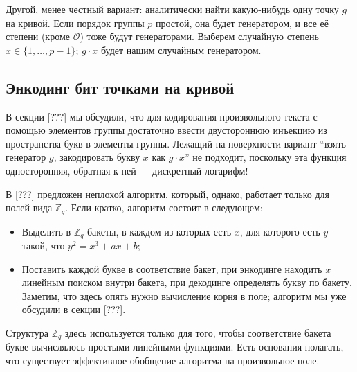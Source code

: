 \documentclass[a4paper,14pt]{extarticle}
\begin{document}
Другой, менее честный вариант: аналитически найти какую-нибудь одну точку $g$ на
кривой. Если порядок группы $p$ простой, она будет генератором, и все её степени
(кроме $\mathcal{O}$) тоже будут генераторами. Выберем случайную степень
$x \in \{1,\dots,p - 1\}$; $g \cdot x$ будет нашим случайным генератором.

\subsection{Энкодинг бит точками на кривой}

В секции [???] мы обсудили, что для кодирования произвольного текста с помощью
элементов группы достаточно ввести двустороннюю инъекцию из пространства букв в
элементы группы. Лежащий на поверхности вариант ``взять генератор $g$,
закодировать букву $x$ как $g \cdot x$'' не подходит, поскольку эта функция
односторонняя, обратная к ней --- дискретный логарифм!

В [???] предложен неплохой алгоритм, который, однако, работает только для полей
вида $\mathbb{Z}_q$. Если кратко, алгоритм состоит в следующем:

\begin{itemize}
    \item Выделить в $\mathbb{Z}_q$ бакеты, в каждом из которых есть $x$, для
        которого есть $y$ такой, что $y^2 = x^3 + a x + b$;
    \item Поставить каждой букве в соответствие бакет, при энкодинге находить
        $x$ линейным поиском внутри бакета, при декодинге определять букву по
        бакету. Заметим, что здесь опять нужно вычисление корня в поле; алгоритм
        мы уже обсудили в секции [???].
\end{itemize}

Структура $\mathbb{Z}_q$ здесь используется только для того, чтобы соответствие
бакета букве вычислялось простыми линейными функциями. Есть основания полагать,
что существует эффективное обобщение алгоритма на произвольное поле.

\newpage

\printbibliography[heading=bibintoc]
\end{document}
